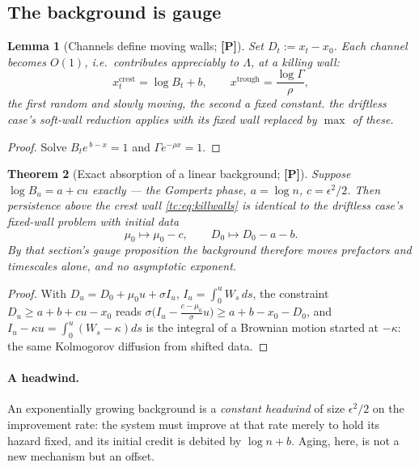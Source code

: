 \documentclass[11pt]{article}
\numberwithin{equation}{section}
\theoremstyle{plain}
\newtheorem{theorem}{Theorem}[section]
\newtheorem{lemma}[theorem]{Lemma}
\theoremstyle{definition}
\theoremstyle{remark}
\begin{document}
\subsection{The background is gauge}\label{tc:subsub:gauge}

\begin{lemma}[Channels define moving walls; \textbf{[P]}]
\label{tc:lem:walls}
Set $D_t:=x_t-x_0$. Each channel becomes $O(1)$, i.e.\ contributes
appreciably to $\Lambda$, at a \emph{killing wall}:
\begin{equation}\label{tc:eq:killwalls}
x^{\mathrm{crest}}_t=\log B_t+b,
\qquad
x^{\mathrm{trough}}=\frac{\log\Gamma}{\rho},
\end{equation}
the first random and slowly moving, the second a fixed constant. the driftless case's soft-wall reduction applies with its fixed wall replaced by
$\max$ of these.
\end{lemma}

\begin{proof}
Solve $B_te^{\,b-x}=1$ and $\Gamma e^{-\rho x}=1$.
\end{proof}

\begin{theorem}[Exact absorption of a linear background; \textbf{[P]}]
\label{tc:thm:absorb}
Suppose $\log B_u=a+cu$ exactly --- the Gompertz phase, $a=\log n$,
$c=\epsilon^{2}/2$. Then persistence above the crest wall
\eqref{tc:eq:killwalls} is \emph{identical} to the driftless case's fixed-wall
problem with initial data
\begin{equation}\label{tc:eq:shift}
\mu_0\longmapsto\mu_0-c,\qquad D_0\longmapsto D_0-a-b .
\end{equation}
By that section's gauge proposition the background therefore moves
prefactors and timescales alone, and no asymptotic exponent.
\end{theorem}

\begin{proof}
With $D_u=D_0+\mu_0u+\sigma I_u$, $I_u=\int_0^u W_s\,ds$, the constraint
$D_u\ge a+b+cu-x_0$ reads
$\sigma\bigl(I_u-\tfrac{c-\mu_0}{\sigma}u\bigr)\ge a+b-x_0-D_0$, and
$I_u-\kappa u=\int_0^u(W_s-\kappa)ds$ is the integral of a Brownian
motion started at $-\kappa$: the same Kolmogorov diffusion from shifted
data.
\end{proof}

\paragraph{A headwind.}\label{tc:rem:headwind}
An exponentially growing background is a \emph{constant headwind} of
size $\epsilon^{2}/2$ on the improvement rate: the system must improve
at that rate merely to hold its hazard fixed, and its initial credit is
debited by $\log n+b$. Aging, here, is not a new mechanism but an
offset.
\end{document}

